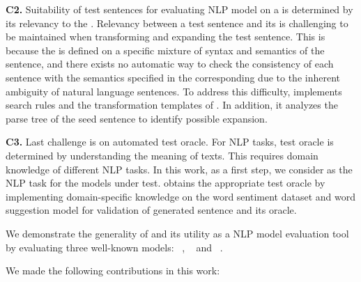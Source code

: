 
\noindent \textbf{C2.} Suitability of test sentences for evaluating NLP
model on a \lc is determined by its relevancy to the
\lc. Relevancy between a test sentence and its \lc is challenging to be maintained when transforming and expanding the test sentence.
This is because the \lc is defined on a specific 
mixture of syntax and semantics of the sentence, and there exists no automatic way to check the consistency of each sentence with the semantics specified in the corresponding \lc due to the inherent ambiguity of natural language sentences. To address this difficulty, \tool implements search rules
and the transformation templates of \lcs. In addition, it analyzes the parse
tree of the seed sentence to identify possible expansion.

\noindent \textbf{C3.} Last challenge is on automated test oracle.  For NLP tasks, test oracle is
determined by understanding the meaning of texts. This requires domain knowledge of different NLP tasks.
In this work, as a first step, we consider \sa as the NLP task for the models under test. \tool obtains the
appropriate test oracle by implementing domain-specific
knowledge on the word sentiment dataset and word suggestion model for validation of generated sentence and its oracle.

We demonstrate the generality of \tool and its utility as a NLP model evaluation
tool by evaluating three well-known \sa models: \Bert~\cite{devlin2019bert},
\Roberta~\cite{liu2019roberta} and \Dbert~\cite{sanh2019distilbert}.


\vspace{2pt}
\noindent
We made the following contributions in this work:

